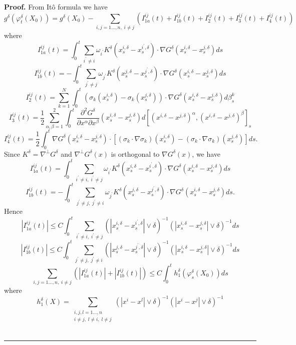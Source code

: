 \documentclass[11pt,a4paper]{article}%
\newenvironment{proof}[1][Proof]{\textbf{#1.} }{\ \rule{0.5em}{0.5em}}
\begin{document}
\begin{proof}
From It\^{o} formula we have
\[
g^{\delta}( \varphi_{t}^{\delta}( X_{0}) ) =g^{\delta}( X_{0}) -\sum
_{i,j=1...,n,\;i\neq j}( I_{1a}^{ij}( t) +I_{1b}^{ij}( t) +I_{2}^{ij}( t)
+I_{3}^{ij}( t)+I_{4}^{ij}( t) )
\]
where
\[
I_{1a}^{ij}( t) =\int_{0}^{t}\sum_{i^{\prime}\neq i}\omega_{i^{\prime}%
}K^{\delta}( x_{s}^{i,\delta}-x_{s}^{i^{\prime},\delta}) \cdot\nabla
G^{\delta}( x_{s}^{i,\delta}-x_{s}^{j,\delta}) ds
\]%
\[
I_{1b}^{ij}( t) =  - \int_{0}^{t}\sum_{j^{\prime}\neq j}\omega_{j^{\prime}%
}K^{\delta}( x_{s}^{j,\delta}-x_{s}^{j^{\prime},\delta}) \cdot\nabla
G^{\delta}( x_{s}^{i,\delta}-x_{s}^{j,\delta}) ds
\]%
\[
I_{2}^{ij}( t) =\sum_{k=1}^{N}\int_{0}^{t}( \sigma_{k}( x_{s}^{i,\delta})
-\sigma_{k}( x_{s}^{j,\delta}) ) \cdot\nabla G^{\delta}( x_{s}^{i,\delta
}-x_{s}^{j,\delta}) d\beta_{s}^{k}%
\]%
\[
I_{3}^{ij}( t) =\frac{1}{2}\sum_{\alpha,\beta=1}^{2}\int_{0}^{t}\frac
{\partial^{2}G^{\delta}}{\partial x^{\alpha}\partial x^{\beta}}(
x_{s}^{i,\delta}-x_{s}^{j,\delta}) d[ ( x^{i,\delta}-x^{j,\delta}) ^{\alpha},(
x^{i,\delta}-x^{j,\delta}) ^{\beta}] _{s}
\]
\[
I_{4}^{ij}( t) =\frac12\int_{0}^{t}\nabla G^{\delta}(
x_{s}^{i,\delta}-x_{s}^{j,\delta})\cdot [ (\sigma_k\cdot \nabla\sigma_k)(x_s^{i,\delta})-(\sigma_k\cdot\nabla \sigma_k)(x_s^{j,\delta})] d s.
\]
Since $K^{\delta}=\nabla^{\perp}G^{\delta}$ and $\nabla^{\perp}G^{\delta}( x)
$ is orthogonal to $\nabla G^{\delta}( x) $, we have
\[
I_{1a}^{ij}( t) =\int_{0}^{t}\sum_{i^{\prime}\neq i,\;i^{\prime}\neq j}%
\omega_{i^{\prime}}K^{\delta}( x_{s}^{i,\delta}-x_{s}^{i^{\prime},\delta})
\cdot\nabla G^{\delta}( x_{s}^{i,\delta}-x_{s}^{j,\delta}) ds
\]%
\[
I_{1b}^{ij}( t) = - \int_{0}^{t}\sum_{j^{\prime}\neq j,\;j^{\prime}\neq
i}\omega_{j^{\prime}}K^{\delta}( x_{s}^{j,\delta}-x_{s}^{j^{\prime},\delta})
\cdot\nabla G^{\delta}( x_{s}^{i,\delta}-x_{s}^{j,\delta}) ds.
\]
Hence
\[
| I_{1a}^{ij}( t) | \leq C\int_{0}^{t}\sum_{i^{\prime}\neq i,\;i^{\prime}\neq
j}( | x_{s}^{i,\delta}-x_{s}^{i^{\prime},\delta}| \vee\delta) ^{-1}( |
x_{s}^{i,\delta}-x_{s}^{j,\delta}| \vee\delta) ^{-1}ds
\]%
\[
| I_{1b}^{ij}( t) | \leq C\int_{0}^{t}\sum_{j^{\prime}\neq j,\;j^{\prime}\neq
i}( | x_{s}^{j,\delta}-x_{s}^{j^{\prime},\delta}| \vee\delta) ^{-1}( |
x_{s}^{i,\delta}-x_{s}^{j,\delta}| \vee\delta) ^{-1}ds
\]%
\[
\sum_{i,j=1...,n,\;i\neq j}( | I_{1a}^{ij}( t) | +| I_{1b}^{ij}( t) | ) \leq
C\int_{0}^{t}h_{1}^{\delta}( \varphi_{s}^{\delta}( X_{0}) ) ds
\]
where
\[
h_{1}^{\delta}( X) =\sum_{\substack{i,j,l=1...,n\\i\neq j,\;l\neq i,\;l\neq
j}}( | x^{i}-x^{l}| \vee\delta) ^{-1}( | x^{i}-x^{j}| \vee\delta) ^{-1}%
\]
\end{proof}
\end{document}
